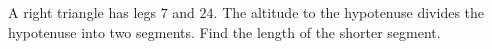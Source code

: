 A right triangle has legs $7$ and $24$. The altitude to the hypotenuse divides the hypotenuse into two segments. Find the length of the shorter segment.
